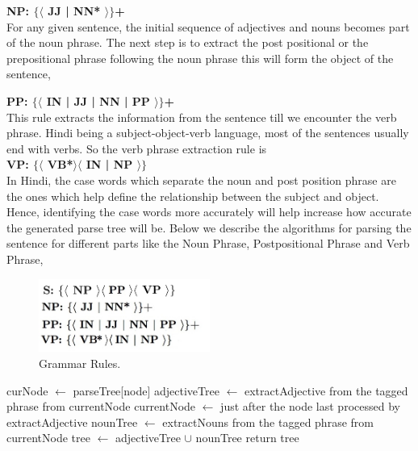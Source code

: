 \textbf {NP: $\{ \langle$ JJ | NN* $\rangle \}$+}  \\

For any given sentence, the initial sequence of adjectives and nouns becomes part of the noun phrase. The next step is to extract the post positional or the prepositional phrase following the noun phrase this will form the object of the sentence,

\textbf {PP: $\{ \langle$ IN | JJ | NN | PP $\rangle \}$+} \\

This rule extracts the information from the sentence till we encounter the verb phrase. Hindi being a subject-object-verb language, most of the sentences usually end with verbs. So the verb phrase extraction rule is \\

\textbf {VP: $\{ \langle$ VB*$\rangle \langle $ IN | NP $\rangle \}$} \\

In Hindi, the case words which separate the noun and post position phrase are the ones which help define the relationship between the subject and object. Hence, identifying the case words more accurately will help increase how accurate the generated parse tree will be. Below we describe the algorithms for parsing the sentence for different parts like the Noun Phrase, Postpositional Phrase and Verb Phrase,

\begin{figure}[htb]
\centering
\includegraphics[width=0.5\textwidth]{images/gammarrules.jpg}
\caption{Grammar Rules.} 
\label{fig:gammarrules}
\end{figure}

\begin {algorithm}
\caption {Extract Noun Phrase}
\begin {algorithmic}[1]
\State curNode $\gets$ parseTree[node]
\State adjectiveTree $\gets$ extractAdjective from the tagged phrase from currentNode
\State currentNode $\gets$ just after the node last processed by extractAdjective
\State nounTree $\gets$ extractNouns from the tagged phrase from currentNode
\State tree $\gets$ adjectiveTree $\cup$ nounTree 
\State return tree
\EndProcedure		
\end {algorithmic}
\end {algorithm}

